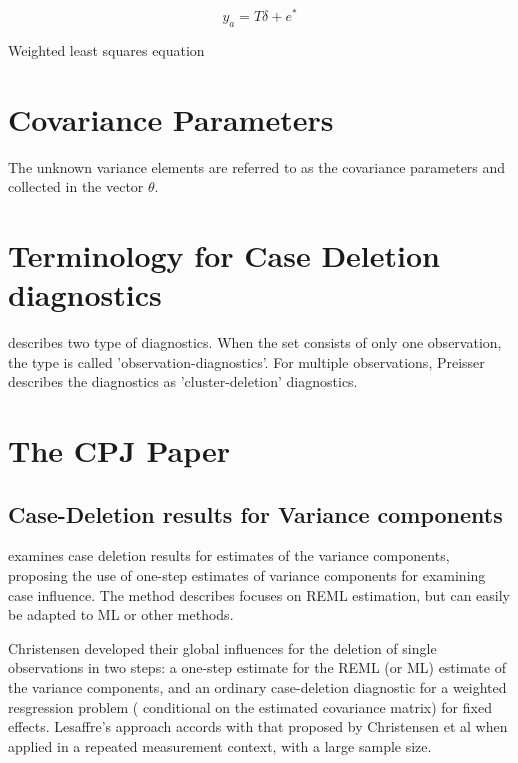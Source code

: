\documentclass[12pt, a4paper]{report}
\theoremstyle{plain}
\theoremstyle{definition}
\theoremstyle{remark}
\begin{document}
\begin{equation}
y_{a} = T \delta + e^{*}
\end{equation}

Weighted least squares equation



\newpage
\section{Covariance Parameters} %
The unknown variance elements are referred to as the covariance parameters and collected in the vector $\theta$.
\newpage
\section{Terminology for Case Deletion diagnostics} %

\citet{preisser} describes two type of diagnostics. When the set
consists of only one observation, the type is called
'observation-diagnostics'. For multiple observations, Preisser
describes the diagnostics as 'cluster-deletion' diagnostics.


\newpage
\section{The CPJ Paper}%

\subsection{Case-Deletion results for Variance components}
\citet{Christensen}examines case deletion results for estimates of the variance components, proposing the use of one-step estimates of variance components for examining case influence. The method describes focuses on REML estimation, but can easily be adapted to ML or other methods.

Christensen developed their global influences for the deletion of single observations in two steps: a one-step estimate for the REML (or ML) estimate of the variance components, and an ordinary case-deletion diagnostic for a weighted resgression problem ( conditional on the estimated covariance matrix) for fixed effects. Lesaffre's approach accords with that proposed by Christensen et al when applied in a repeated measurement context, with a large
sample size.
\end{document}
